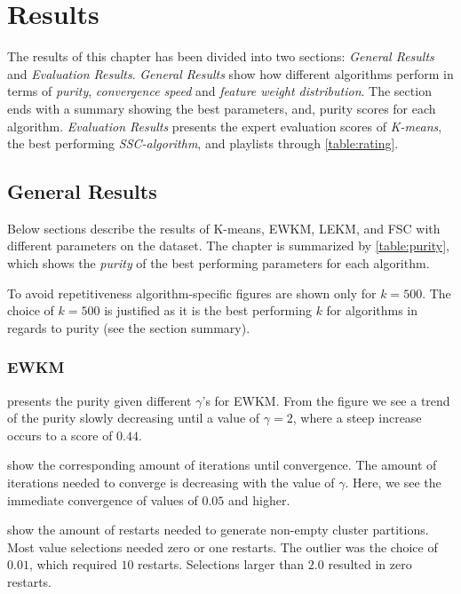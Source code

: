 \documentclass[../report.tex]{subfiles}
\begin{document}
\chapter{Results}
The results of this chapter has been divided into two sections: \textit{General Results} and \textit{Evaluation Results}. \textit{General Results} show how different algorithms perform in terms of \textit{purity}, \textit{convergence speed} and \textit{feature weight distribution}. The section ends with a summary showing the best parameters, and, purity scores for each algorithm. \textit{Evaluation Results} presents the expert evaluation scores of \textit{K-means}, the best performing \textit{SSC-algorithm}, and playlists through \cref{table:rating}.

\section{General Results}
Below sections describe the results of K-means, EWKM, LEKM, and FSC with different parameters on the dataset. The chapter is summarized by \cref{table:purity}, which shows the \textit{purity} of the best performing parameters for each algorithm.

To avoid repetitiveness algorithm-specific figures are shown only for $k=500$. The choice of $k=500$ is justified as it is the best performing $k$ for algorithms in regards to purity (see the section summary).

\subsection{EWKM}
\label{subsection:ewkm}

 presents the purity given different $\gamma$'s for EWKM. From the figure we see a trend of the purity slowly decreasing until a value of $\gamma = 2$, where a steep increase occurs to a score of $0.44$.

 show the corresponding amount of iterations until convergence. The amount of iterations needed to converge is decreasing with the value of $\gamma$. Here, we see the immediate convergence of values of $0.05$ and higher.

 show the amount of restarts needed to generate non-empty cluster partitions. Most value selections needed zero or one restarts. The outlier was the choice of $0.01$, which required $10$ restarts. Selections larger than $2.0$ resulted in zero restarts.
\end{document}
